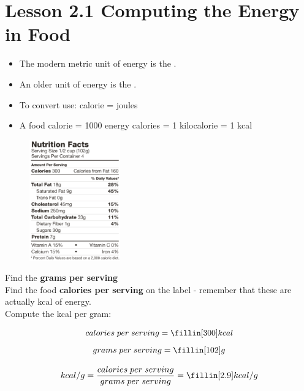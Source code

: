 \documentclass[answers,12pt]{exam}
\begin{document}
\section{Lesson 2.1 Computing the Energy in Food}

\begin{itemize}
    \item The modern metric unit of energy is the \fillin[joule]. 
    \item An older unit of energy is the \fillin[calorie].
    \item To convert use: \fillin[1] calorie = \fillin[4.2] joules
    \item A food calorie = 1000 energy calories = 1 kilocalorie = 1 kcal
\end{itemize}
    

\begin{figure} %
    \centering
    \includegraphics[width=0.35\textwidth]{food_label.png}
\end{figure}


Find the \textbf{grams per serving} \\ 

Find the food \textbf{calories per serving} on the label - remember that these are actually kcal of energy. \\

Compute the kcal per gram:

$$ calories \; per \; serving = \fillin[300] kcal $$
$$ grams \; per \; serving = \fillin[102] g $$

$$ kcal/g = \frac{calories \; per \; serving}{grams \; per \; serving} = \fillin[2.9] kcal/g  $$

\vspace{1cm}




    
    
\end{document}
